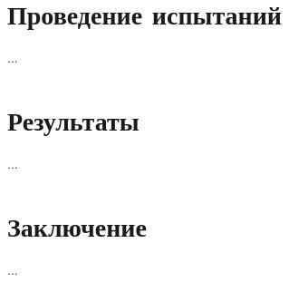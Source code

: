 \documentclass[russian]{article}
\begin{document}
\section*{Проведение испытаний}

...

\section*{Результаты}

...

\section*{Заключение}

...

\end{document}
